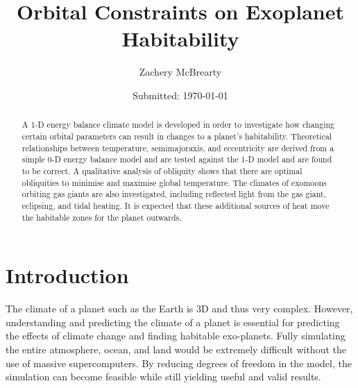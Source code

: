 \documentclass[12pt, onecolumn]{revtex4-2}    %
\begin{document}
\title{Orbital Constraints on Exoplanet Habitability}
\date{Submitted: \today{}}
\author{Zachery McBrearty}

\begin{abstract}

    A 1-D energy balance climate model is developed in order to investigate how changing certain orbital parameters can result in changes to a planet's habitability.
    Theoretical relationships between temperature, semimajoraxis, and eccentricity are derived from a simple 0-D energy balance model and are tested against the 1-D model and are found to be correct.
    A qualitative analysis of obliquity shows that there are optimal obliquities to minimise and maximise global temperature.
    The climates of exomoons orbiting gas giants are also investigated, including reflected light from the gas giant, eclipsing, and tidal heating.
    It is expected that these additional sources of heat move the habitable zones for the planet outwards.

\end{abstract}


\maketitle

\tableofcontents

\newpage

\section{Introduction}

The climate of a planet such as the Earth is 3D and thus very complex.
However, understanding and predicting the climate of a planet is essential for predicting the effects of climate change and finding habitable exo-planets.
Fully simulating the entire atmosphere, ocean, and land would be extremely difficult without the use of massive supercomputers.
By reducing degrees of freedom in the model, the simulation can become feasible while still yielding useful and valid results.
\end{document}
